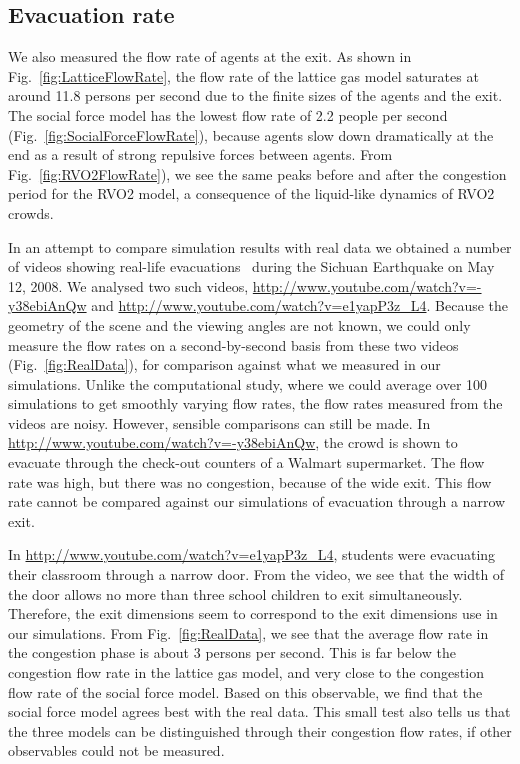 \subsection{Evacuation rate}

We also measured the flow rate of agents at the exit. As shown in Fig.~\ref{fig:LatticeFlowRate}, the flow rate of the lattice gas model saturates at around 11.8 persons per second due to the finite sizes of the agents and the exit. The social force model has the lowest flow rate of 2.2 people per second (Fig.~\ref{fig:SocialForceFlowRate}), because agents slow down dramatically at the end as a result of strong repulsive forces between agents. From Fig.~\ref{fig:RVO2FlowRate}), we see the same peaks before and after the congestion period for the RVO2 model, a consequence of the liquid-like dynamics of RVO2 crowds.

In an attempt to compare simulation results with real data we obtained a number of videos showing real-life evacuations~\cite{Yang2013,Yang2011} during the Sichuan Earthquake on May 12, 2008. We analysed two such videos, \url{http://www.youtube.com/watch?v=-y38ebiAnQw} and \url{http://www.youtube.com/watch?v=e1yapP3z_L4}.
Because the geometry of the scene and the viewing angles are not known, we could only measure the flow rates on a second-by-second basis from these two videos (Fig.~\ref{fig:RealData}), for comparison against what we measured in our simulations. Unlike the computational study, where we could average over 100 simulations to get smoothly varying flow rates, the flow rates measured from the videos are noisy. However, sensible comparisons can still be made. In \url{http://www.youtube.com/watch?v=-y38ebiAnQw}, the crowd is shown to evacuate through the check-out counters of a Walmart supermarket. The flow rate was high, but there was no congestion, because of the wide exit. This flow rate cannot be compared against our simulations of evacuation through a narrow exit.

In \url{http://www.youtube.com/watch?v=e1yapP3z_L4}, students were evacuating their classroom through a narrow door. From the video, we see that the width of the door allows no more than three school children to exit simultaneously. Therefore, the exit dimensions seem to correspond to the exit dimensions use in our simulations. From Fig.~\ref{fig:RealData}, we see that the average flow rate in the congestion phase is about 3 persons per second. This is far below the congestion flow rate in the lattice gas model, and very close to the congestion flow rate of the social force model. Based on this observable, we find that the social force model agrees best with the real data. This small test also tells us that the three models can be distinguished through their congestion flow rates, if other observables could not be measured.


